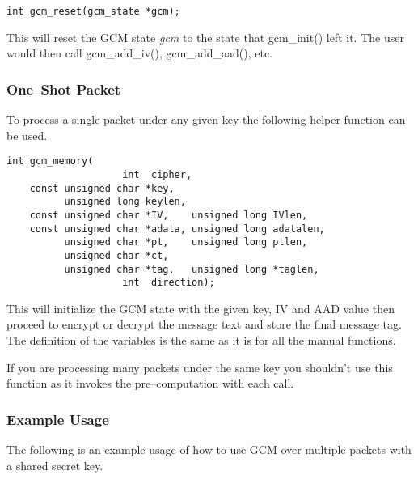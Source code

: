 \documentclass[synpaper]{book}
\begin{document}
\begin{verbatim}
int gcm_reset(gcm_state *gcm);
\end{verbatim}

This will reset the GCM state \textit{gcm} to the state that gcm\_init() left it.  The user would then call gcm\_add\_iv(), gcm\_add\_aad(), etc.

\subsubsection{One--Shot Packet}
To process a single packet under any given key the following helper function can be used.

\begin{verbatim}
int gcm_memory(
                    int  cipher,
    const unsigned char *key,
          unsigned long keylen,
    const unsigned char *IV,    unsigned long IVlen,
    const unsigned char *adata, unsigned long adatalen,
          unsigned char *pt,    unsigned long ptlen,
          unsigned char *ct,
          unsigned char *tag,   unsigned long *taglen,
                    int  direction);
\end{verbatim}

This will initialize the GCM state with the given key, IV and AAD value then proceed to encrypt or decrypt the message text and store the final
message tag.  The definition of the variables is the same as it is for all the manual functions.

If you are processing many packets under the same key you shouldn't use this function as it invokes the pre--computation with each call.

\subsubsection{Example Usage}
The following is an example usage of how to use GCM over multiple packets with a shared secret key.
\end{document}
